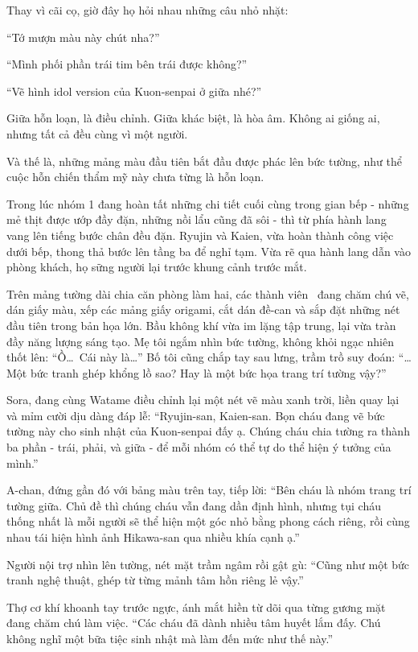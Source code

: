 \documentclass[../main.tex]{subfiles}
\begin{document}
Thay vì cãi cọ, giờ đây họ hỏi nhau những câu nhỏ nhặt:

``Tớ mượn màu này chút nha?''

``Mình phối phần trái tim bên trái được không?''

``Vẽ hình idol version của Kuon-senpai ở giữa nhé?''

Giữa hỗn loạn, là điều chỉnh. Giữa khác biệt, là hòa âm.
Không ai giống ai, nhưng tất cả đều cùng vì một người.

Và thế là, những mảng màu đầu tiên bắt đầu được phác lên bức tường, như thể cuộc hỗn chiến thẩm mỹ này chưa từng là hỗn loạn.

\ct

Trong lúc nhóm 1 đang hoàn tất những chi tiết cuối cùng trong gian bếp - những mẻ thịt được ướp đầy đặn, những nồi lẩu cũng đã sôi - thì từ phía hành lang vang lên tiếng bước chân đều đặn. Ryujin và Kaien, vừa hoàn thành công việc dưới bếp, thong thả bước lên tầng ba để nghỉ tạm. Vừa rẽ qua hành lang dẫn vào phòng khách, họ sững người lại trước khung cảnh trước mắt.

Trên mảng tường dài chia căn phòng làm hai, các thành viên \hll\ đang chăm chú vẽ, dán giấy màu, xếp các mảng giấy origami, cắt dán đề-can và sắp đặt những nét đầu tiên trong bản họa lớn. Bầu không khí vừa im lặng tập trung, lại vừa tràn đầy năng lượng sáng tạo. Mẹ tôi ngắm nhìn bức tường, không khỏi ngạc nhiên thốt lên: ``Ồ\dots\ Cái này là\dots'' Bố tôi cũng chắp tay sau lưng, trầm trồ suy đoán: ``\dots Một bức tranh ghép khổng lồ sao? Hay là một bức họa trang trí tường vậy?''

Sora, đang cùng Watame điều chỉnh lại một nét vẽ màu xanh trời, liền quay lại và mỉm cười dịu dàng đáp lễ: ``Ryujin-san, Kaien-san. Bọn cháu đang vẽ bức tường này cho sinh nhật của Kuon-senpai đấy ạ. Chúng cháu chia tường ra thành ba phần - trái, phải, và giữa - để mỗi nhóm có thể tự do thể hiện ý tưởng của mình.''

A-chan, đứng gần đó với bảng màu trên tay, tiếp lời: ``Bên cháu là nhóm trang trí tường giữa. Chủ đề thì chúng cháu vẫn đang dần định hình, nhưng tụi cháu thống nhất là mỗi người sẽ thể hiện một góc nhỏ bằng phong cách riêng, rồi cùng nhau tái hiện hình ảnh Hikawa-san qua nhiều khía cạnh ạ.''

Người nội trợ nhìn lên tường, nét mặt trầm ngâm rồi gật gù: ``Cũng như một bức tranh nghệ thuật, ghép từ từng mảnh tâm hồn riêng lẻ vậy.''

Thợ cơ khí khoanh tay trước ngực, ánh mắt hiền từ dõi qua từng gương mặt đang chăm chú làm việc. ``Các cháu đã dành nhiều tâm huyết lắm đấy. Chú không nghĩ một bữa tiệc sinh nhật mà làm đến mức như thế này.''
\end{document}
